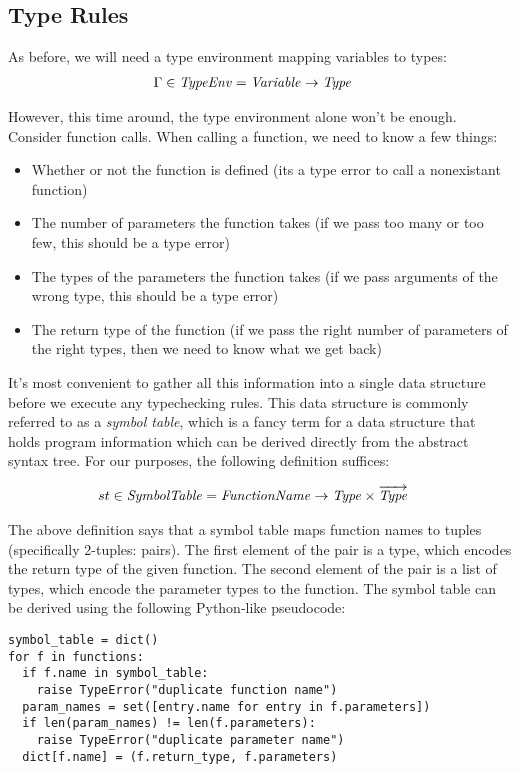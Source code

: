 \subsection{Type Rules}
As before, we will need a type environment mapping variables to types:
\begin{align*}
  \Gamma \in \mathit{TypeEnv} &= \mathit{Variable} \to \mathit{Type}
\end{align*}

However, this time around, the type environment alone won't be enough.
Consider function calls.
When calling a function, we need to know a few things:
\begin{itemize}
\item Whether or not the function is defined (its a type error to call a nonexistant function)
\item The number of parameters the function takes (if we pass too many or too few, this should be a type error)
\item The types of the parameters the function takes (if we pass arguments of the wrong type, this should be a type error)
\item The return type of the function (if we pass the right number of parameters of the right types, then we need to know what we get back)
\end{itemize}

It's most convenient to gather all this information into a single data structure before we execute any typechecking rules.
This data structure is commonly referred to as a \emph{symbol table}, which is a fancy term for a data structure that holds program information which can be derived directly from the abstract syntax tree.
For our purposes, the following definition suffices:

\begin{align*}
  st \in \mathit{SymbolTable} &= \mathit{FunctionName} \to \mathit{Type} \times \overrightarrow{\mathit{Type}}
\end{align*}

The above definition says that a symbol table maps function names to tuples (specifically 2-tuples: pairs).
The first element of the pair is a type, which encodes the return type of the given function.
The second element of the pair is a list of types, which encode the parameter types to the function.
The symbol table can be derived using the following Python-like pseudocode:
\begin{verbatim}
symbol_table = dict()
for f in functions:
  if f.name in symbol_table:
    raise TypeError("duplicate function name")
  param_names = set([entry.name for entry in f.parameters])
  if len(param_names) != len(f.parameters):
    raise TypeError("duplicate parameter name")
  dict[f.name] = (f.return_type, f.parameters)
\end{verbatim}

